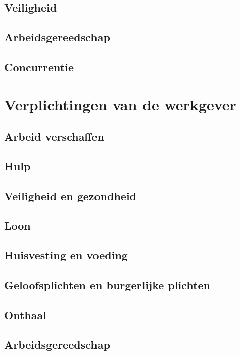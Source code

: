 \subsection{Veiligheid}

\subsection{Arbeidsgereedschap}

\subsection{Concurrentie}

\section{Verplichtingen van de werkgever}

\subsection{Arbeid verschaffen}

\subsection{Hulp}

\subsection{Veiligheid en gezondheid}

\subsection{Loon}

\subsection{Huisvesting en voeding}

\subsection{Geloofsplichten en burgerlijke plichten}

\subsection{Onthaal}

\subsection{Arbeidsgereedschap}

